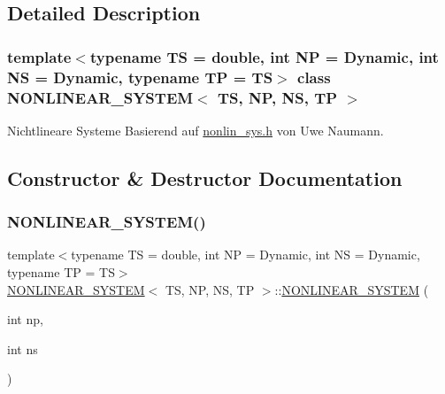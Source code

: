 \subsection{Detailed Description}
\subsubsection*{template$<$typename TS = double, int NP = Dynamic, int NS = Dynamic, typename TP = TS$>$\newline
class N\+O\+N\+L\+I\+N\+E\+A\+R\+\_\+\+S\+Y\+S\+T\+E\+M$<$ T\+S, N\+P, N\+S, T\+P $>$}

Nichtlineare Systeme Basierend auf \mbox{\hyperlink{nonlin__sys_8h}{nonlin\+\_\+sys.\+h}} von Uwe Naumann. 

\subsection{Constructor \& Destructor Documentation}
\mbox{\label{class_n_o_n_l_i_n_e_a_r___s_y_s_t_e_m_aa6073542adb090bf99729df5b03ca707}} 
\subsubsection{\texorpdfstring{N\+O\+N\+L\+I\+N\+E\+A\+R\+\_\+\+S\+Y\+S\+T\+E\+M()}{NONLINEAR\_SYSTEM()}}
{\footnotesize\ttfamily template$<$typename TS = double, int NP = Dynamic, int NS = Dynamic, typename TP = TS$>$ \\
\mbox{\hyperlink{class_n_o_n_l_i_n_e_a_r___s_y_s_t_e_m}{N\+O\+N\+L\+I\+N\+E\+A\+R\+\_\+\+S\+Y\+S\+T\+EM}}$<$ TS, NP, NS, TP $>$\+::\mbox{\hyperlink{class_n_o_n_l_i_n_e_a_r___s_y_s_t_e_m}{N\+O\+N\+L\+I\+N\+E\+A\+R\+\_\+\+S\+Y\+S\+T\+EM}} (\begin{DoxyParamCaption}\item[{int}]{np,  }\item[{int}]{ns }\end{DoxyParamCaption})\hspace{0.3cm}{\ttfamily [inline]}}



